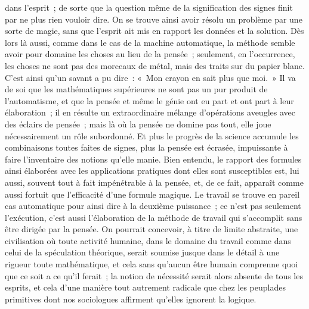 \documentclass[french,twoside]{book} %
\begin{document}
dans l'esprit ; de sorte que la question même de la signification des signes finit par ne plus rien vouloir dire. On se trouve ainsi avoir résolu un problème par une sorte de magie, sans que l'esprit ait mis en rapport les données et la solution. Dès lors là aussi, comme dans le cas de la machine automatique, la méthode semble avoir pour domaine les choses au lieu de la pensée ; seulement, en l'occurrence, les choses ne sont pas des morceaux de métal, mais des traits sur du papier blanc. C'est ainsi qu'un savant a pu dire : « Mon crayon en sait plus que moi. » Il va de soi que les mathématiques supérieures ne sont pas un pur produit de l'automatisme, et que la pensée et même le génie ont eu part et ont part à leur élaboration ; il en résulte un extraordinaire mélange d'opérations aveugles avec des éclairs de pensée ; mais là où la pensée ne domine pas tout, elle joue nécessairement un rôle subordonné. Et plus le progrès de la science accumule les combinaisons toutes faites de signes, plus la pensée est écrasée, impuissante à faire l'inventaire des notions qu'elle manie. Bien entendu, le rapport des formules ainsi élaborées avec les applications pratiques dont elles sont susceptibles est, lui aussi, souvent tout à fait impénétrable à la pensée, et, de ce fait, apparaît comme aussi fortuit que l'efficacité d'une formule magique. Le travail se trouve en pareil cas automatique pour ainsi dire à la deuxième puissance ; ce n'est pas seulement l'exécution, c'est aussi l'élaboration de la méthode de travail qui s'accomplit sans être dirigée par la pensée. On pourrait concevoir, à titre de limite abstraite, une civilisation où toute activité humaine, dans le domaine du travail comme dans celui de la spéculation théorique, serait soumise jusque dans le détail à une rigueur toute mathématique, et cela sans qu'aucun être humain comprenne quoi que ce soit a ce qu'il ferait ; la notion de nécessité serait alors absente de tous les esprits, et cela d'une manière tout autrement radicale que chez les peuplades primitives dont nos sociologues affirment qu'elles ignorent la logique.\par
\end{document}
